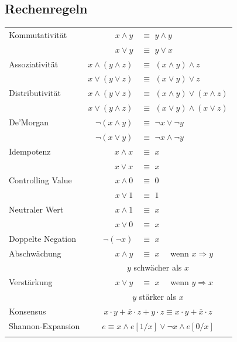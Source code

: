 \begin{multicols}{2}
	\subsection{Rechenregeln}
		\renewcommand{\arraystretch}{1.5}
		\begin{tabular}{l r @{  } l}
		Kommutativität      	&   $x \land y$           	& $\equiv$  $y \land y$	\\
									&$x \lor y$   						& $\equiv$  $y \lor x$   \\\hline
		Assoziativität      	&   $x \land (y \land z)$ 	& $\equiv$  $(x \land y) \land z$	\\ 
									&   $x \lor (y \lor z)$  		& $\equiv$  $(x \lor y) \lor z$\\\hline
		Distributivität	  	&	 $x \land (y \lor z)$		& $\equiv$	 $(x \land y) \lor (x \land z)$\\
									&	 $x \lor (y \land z)$		&$\equiv$	 $(x \lor y) \land (x \lor z)$\\\hline
		De'Morgan           	&   $\lnot(x \land y)$  		& $\equiv$  $\lnot x \lor \lnot y$ \\
									&   $\lnot(x \lor y)$  			& $\equiv$  $\lnot x \land \lnot y$\\\hline
		Idempotenz          	&   $x \land x$    				& $\equiv$  $x$\\
									&   $x \lor x$  					& $\equiv$  $x$\\\hline
		Controlling Value   	&   $x \land 0$    				& $\equiv$  $0$\\
									&   $x \lor 1$  					&$\equiv$   $1$\\\hline
		Neutraler Wert      	&   $x \land 1$    				& $\equiv$  $x$\\
									&   $x \lor 0$  					& $\equiv$  $x$\\ \hline
		Doppelte Negation		&	 $\lnot(\lnot x)$				&$\equiv$	 $x$ 
 		\\\hline
 		Abschwächung   &		$x \land y $		& $\equiv$ $x \quad$ wenn $x \Rightarrow y$ \\
 		 & \multicolumn{2}{c}{$y$ schwächer als $x$} \\ \hline
 		Verstärkung   &		$x \lor y $		& $\equiv$	$x \quad$ wenn $y \Rightarrow x$ \\
 		 & \multicolumn{2}{c}{$y$ stärker als $x$} \\ \hline
 		Konsensus   & \multicolumn{2}{c}{ $ x \cdot y + \overline x \cdot z + y \cdot z \equiv  x \cdot y + \overline x \cdot z $ } \\ \hline
 		Shannon-Expansion   & \multicolumn{2}{c}{ $ e \equiv x \land e[1/x] \lor \lnot x \land e[0/x] $ } \\\\
		\end{tabular}
		

\end{multicols}
